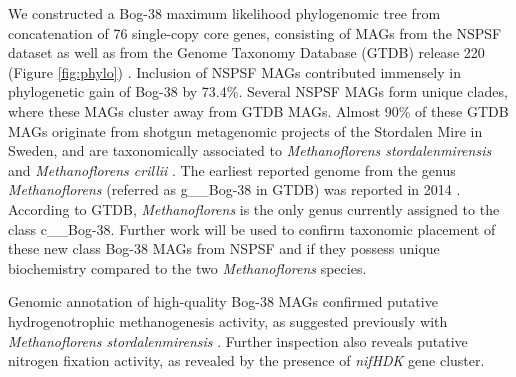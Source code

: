 \begin{multicols}{2}[\columnsep=0.4cm]
    We constructed a Bog-38 maximum likelihood phylogenomic tree from concatenation of 76 single-copy core genes, consisting of MAGs from the NSPSF dataset as well as from the Genome Taxonomy Database (GTDB) release 220 (Figure \ref{fig:phylo}) \cite{Lee_2019_gtotree}. Inclusion of NSPSF MAGs contributed immensely in phylogenetic gain of Bog-38 by 73.4\%. Several NSPSF MAGs form unique clades, where these MAGs cluster away from GTDB MAGs. Almost 90\% of these GTDB MAGs originate from shotgun metagenomic projects of the Stordalen Mire in Sweden, and are taxonomically associated to \emph{Methanoflorens stordalenmirensis} \cite{Mondav_2014_Methanoflorens} and \emph{Methanoflorens crillii} \cite{Woodcroft_2018_permafrost}. The earliest reported genome from the genus \emph{Methanoflorens} (referred as g\_\_Bog-38 in GTDB) was reported in 2014 \cite{Mondav_2014_Methanoflorens}. According to GTDB, \textit{Methanoflorens} is the only genus currently assigned to the class c\_\_Bog-38. Further work will be used to confirm taxonomic placement of these new class Bog-38 MAGs from NSPSF and if they possess unique biochemistry compared to the two \emph{Methanoflorens} species.

    Genomic annotation of high-quality Bog-38 MAGs confirmed putative hydrogenotrophic methanogenesis activity, as suggested previously with \textit{Methanoflorens stordalenmirensis} \cite{Mondav_2014_Methanoflorens}. Further inspection also reveals putative nitrogen fixation activity, as revealed by the presence of \textit{nifHDK} gene cluster.
    

\end{multicols}
